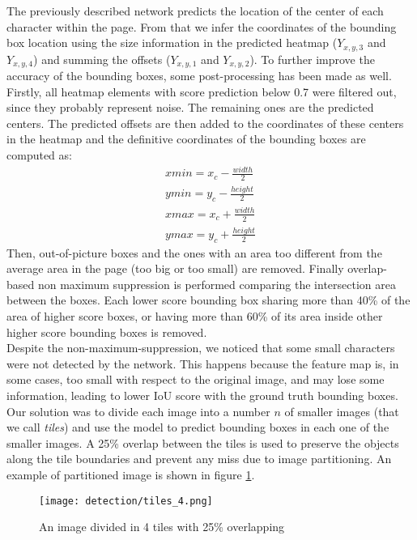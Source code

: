 The previously described network predicts the location of the center of each character within the page. From that we infer the coordinates of the bounding box location using the size information in the predicted heatmap ($Y_{x,y,3}$ and $Y_{x,y,4}$) and summing the offsets ($Y_{x,y,1}$ and $Y_{x,y,2}$). To further improve the accuracy of the bounding boxes, some post-processing has been made as well. Firstly, all heatmap elements with score prediction below 0.7 were filtered out, since they probably represent noise. The remaining ones are the predicted centers. The predicted offsets are then added to the coordinates of these centers in the heatmap and the definitive coordinates of the bounding boxes are computed as:
\begin{eqnarray*}
	xmin=x_c - \frac{width}{2}\\
	ymin= y_c - \frac{height}{2}\\
	xmax=x_c + \frac{width}{2}\\
	ymax=y_c + \frac{height}{2}
\end{eqnarray*}
Then, out-of-picture boxes and the ones with an area too different from the average area in the page (too big or too small) are removed. Finally overlap-based non maximum suppression is performed comparing the intersection area between the boxes. Each lower score bounding box sharing more than 40\% of the area of higher score boxes, or having more than 60\% of its area inside other higher score bounding boxes is removed.\\

\noindent Despite the non-maximum-suppression, we noticed that some small characters were not detected by the network. This happens because the feature map is, in some cases, too small with respect to the original image, and may lose some information, leading to lower IoU score with the ground truth bounding boxes. 
Our solution was to divide each image into a number $n$ of smaller images (that we call \textit{tiles}) and use the model to predict bounding boxes in each one of the smaller images. A 25\% overlap between the tiles is used to preserve the objects along the tile boundaries and prevent any miss due to image partitioning. An example of partitioned image is shown in figure \ref{fig:tiles4}.

\begin{figure}
	\centering
	\texttt{[image: detection/tiles\_4.png]}
	\caption{An image divided in 4 tiles with 25\% overlapping}
	\label{fig:tiles4}
\end{figure}

